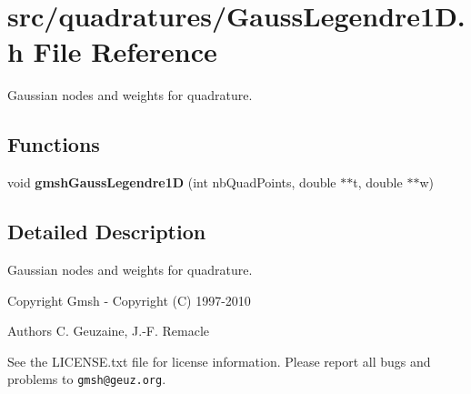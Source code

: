 \section{src/quadratures/\-Gauss\-Legendre1\-D.h File Reference}
\label{GaussLegendre1D_8h}


Gaussian nodes and weights for quadrature.  


\subsection*{Functions}
\begin{DoxyCompactItemize}
\item 
void {\bfseries gmsh\-Gauss\-Legendre1\-D} (int nb\-Quad\-Points, double $\ast$$\ast$t, double $\ast$$\ast$w)\label{GaussLegendre1D_8h_a7172c79fea6a3388870f9f79d2dc9de4}

\end{DoxyCompactItemize}


\subsection{Detailed Description}
Gaussian nodes and weights for quadrature. \begin{DoxyCopyright}{Copyright}
Gmsh -\/ Copyright (C) 1997-\/2010 
\end{DoxyCopyright}
\begin{DoxyAuthor}{Authors}
C. Geuzaine, J.-\/\-F. Remacle
\end{DoxyAuthor}
See the L\-I\-C\-E\-N\-S\-E.\-txt file for license information. Please report all bugs and problems to {\tt gmsh@geuz.\-org}. 